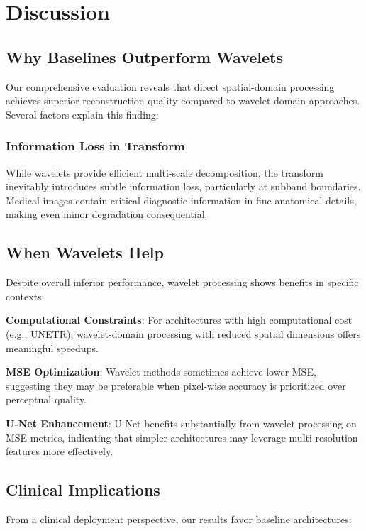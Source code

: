 \documentclass[conference]{IEEEtran}
\begin{document}
\section{Discussion}

\subsection{Why Baselines Outperform Wavelets}

Our comprehensive evaluation reveals that direct spatial-domain processing achieves superior reconstruction quality compared to wavelet-domain approaches. Several factors explain this finding:

\subsubsection{Information Loss in Transform}

While wavelets provide efficient multi-scale decomposition, the transform inevitably introduces subtle information loss, particularly at subband boundaries. Medical images contain critical diagnostic information in fine anatomical details, making even minor degradation consequential.

\subsection{When Wavelets Help}

Despite overall inferior performance, wavelet processing shows benefits in specific contexts:

\textbf{Computational Constraints}: For architectures with high computational cost (e.g., UNETR), wavelet-domain processing with reduced spatial dimensions offers meaningful speedups.

\textbf{MSE Optimization}: Wavelet methods sometimes achieve lower MSE, suggesting they may be preferable when pixel-wise accuracy is prioritized over perceptual quality.

\textbf{U-Net Enhancement}: U-Net benefits substantially from wavelet processing on MSE metrics, indicating that simpler architectures may leverage multi-resolution features more effectively.

\subsection{Clinical Implications}

From a clinical deployment perspective, our results favor baseline architectures:
\end{document}
